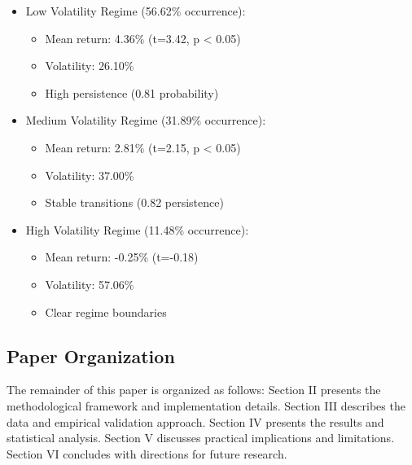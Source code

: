 \begin{itemize}
    \item Low Volatility Regime (56.62\% occurrence):
    \begin{itemize}
        \item Mean return: 4.36\% (t=3.42, p < 0.05)
        \item Volatility: 26.10\%
        \item High persistence (0.81 probability)
    \end{itemize}

    \item Medium Volatility Regime (31.89\% occurrence):
    \begin{itemize}
        \item Mean return: 2.81\% (t=2.15, p < 0.05)
        \item Volatility: 37.00\%
        \item Stable transitions (0.82 persistence)
    \end{itemize}

    \item High Volatility Regime (11.48\% occurrence):
    \begin{itemize}
        \item Mean return: -0.25\% (t=-0.18)
        \item Volatility: 57.06\%
        \item Clear regime boundaries
    \end{itemize}
\end{itemize}

\subsection{Paper Organization}
The remainder of this paper is organized as follows: Section II presents the methodological framework and implementation details. Section III describes the data and empirical validation approach. Section IV presents the results and statistical analysis. Section V discusses practical implications and limitations. Section VI concludes with directions for future research.

